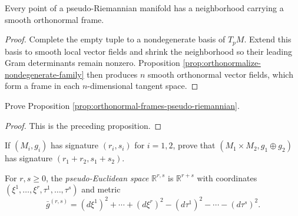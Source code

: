 \begin{proposition}
\label{prop:orthonormal-frames-pseudo-riemannian}
\leanok
{}
Every point of a pseudo-Riemannian manifold has a neighborhood carrying a smooth
orthonormal frame.
\end{proposition}

\begin{proof}
\leanok
{}
\sketch Complete the empty tuple to a nondegenerate basis of $T_pM$. Extend this
basis to smooth local vector fields and shrink the neighborhood so their leading
Gram determinants remain nonzero. Proposition
\ref{prop:orthonormalize-nondegenerate-family} then produces $n$ smooth
orthonormal vector fields, which form a frame in each $n$-dimensional tangent
space.
\end{proof}

\begin{exercise}
\label{exer:prove-orthonormal-frames}
\leanok
{}
Prove Proposition \ref{prop:orthonormal-frames-pseudo-riemannian}.
\end{exercise}

\begin{proof}
\leanok
{}
\sketch This is the preceding proposition.
\end{proof}

\begin{exercise}
\label{exer:product-pseudo-riemannian}
If $(M_i,g_i)$ has signature $(r_i,s_i)$ for $i=1,2$, prove that
$(M_1\times M_2,g_1\oplus g_2)$ has signature
$(r_1+r_2,s_1+s_2)$.
\end{exercise}

For $r,s\geq0$, the \emph{pseudo-Euclidean space} $\mathbb R^{r,s}$ is
$\mathbb R^{r+s}$ with coordinates
$(\xi^1,\ldots,\xi^r,\tau^1,\ldots,\tau^s)$ and metric
\begin{equation}
\bar g^{(r,s)}=(d\xi^1)^2+\cdots+(d\xi^r)^2
 -(d\tau^1)^2-\cdots-(d\tau^s)^2. \tag{2.24}
\end{equation}

